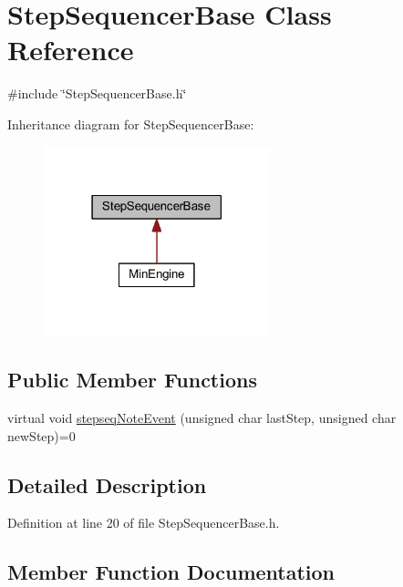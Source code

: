 \hypertarget{class_step_sequencer_base}{}\section{Step\+Sequencer\+Base Class Reference}
\label{class_step_sequencer_base}


{\ttfamily \#include \char`\"{}Step\+Sequencer\+Base.\+h\char`\"{}}



Inheritance diagram for Step\+Sequencer\+Base\+:
\nopagebreak
\begin{figure}[H]
\begin{center}
\leavevmode
\includegraphics[width=186pt]{class_step_sequencer_base__inherit__graph}
\end{center}
\end{figure}
\subsection*{Public Member Functions}
\begin{DoxyCompactItemize}
\item 
virtual void \hyperlink{class_step_sequencer_base_a9f32f8ae8eb8afb1c2ea39ed8d856657}{stepseq\+Note\+Event} (unsigned char last\+Step, unsigned char new\+Step)=0
\end{DoxyCompactItemize}


\subsection{Detailed Description}


Definition at line 20 of file Step\+Sequencer\+Base.\+h.



\subsection{Member Function Documentation}
\mbox{\label{class_step_sequencer_base_a9f32f8ae8eb8afb1c2ea39ed8d856657}} 
